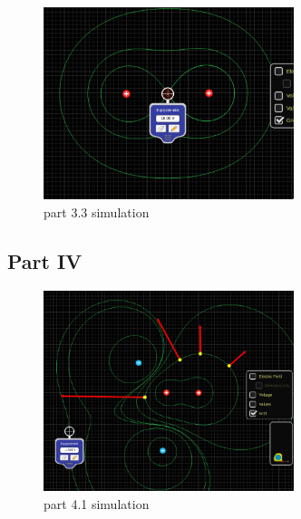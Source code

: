 \documentclass{article}
\begin{document}
\begin{figure}[H]
	\begin{center}
		\includegraphics[width=0.65\textwidth]{part-3.3-simulation} %
		\caption{part 3.3 simulation}
	\end{center}
\end{figure}

\subsection{Part IV}%
\label{sub:part_4}

\begin{figure}[H]
	\begin{center}
		\includegraphics[width=0.65\textwidth]{part-4-simulation} %
		\caption{part 4.1 simulation}
	\end{center}
\end{figure}
\end{document}
